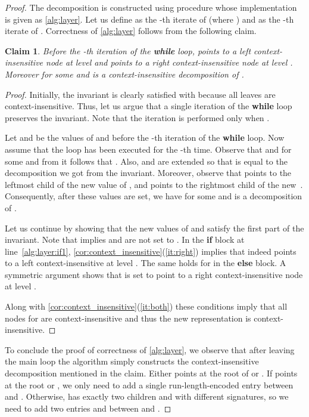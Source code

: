 \documentclass[a4paper]{article}
\newtheorem{claim}[theorem]{Claim}
\theoremstyle{remark}
\begin{document}
\begin{proof}
The decomposition is constructed using procedure  whose implementation is given as \cref{alg:layer}.
Let us define  as the -th iterate of  (where )
and  as the -th iterate of .
Correctness of \cref{alg:layer} follows from the following claim.

\begin{claim}
Before the -th iteration of the \textbf{while} loop,
 points to a left context-insensitive node at level  and  points to a right context-insensitive node at level .
Moreover  for some  and 
is a context-insensitive decomposition of .
\end{claim}
\begin{proof}
Initially, the invariant is clearly satisfied with  because all leaves are context-insensitive.
Thus, let us argue that a single iteration of the \textbf{while} loop preserves the invariant.
Note that the iteration is performed only when .

Let  and  be the values of  and  before the -th iteration
of the \textbf{while} loop.
Now assume that the loop has been executed for the -th time.
Observe that  and  for some 
and from  it follows that .
Also,  and  are extended so that
 is equal to the decomposition
we got from the invariant. Moreover, observe that  points to the leftmost child of the new value of ,
and  points to the rightmost child of the new~. Consequently, after these values are set, we have  for some 
and  is a decomposition of .

Let us continue by showing that the new values of  and  satisfy the first part of the invariant.
Note that  implies  and  are not set to .
In the \textbf{if} block at line~\ref{alg:layer:if1}, \cref{cor:context_insensitive}(\ref{it:right}) implies
that  indeed points to a left context-insensitive at level .
The same holds for  in the \textbf{else} block.
A symmetric argument shows that  is set to point to a right context-insensitive node at level .

Along with \cref{cor:context_insensitive}(\ref{it:both}) these conditions imply
 that all nodes  for  are context-insensitive and thus the new representation is context-insensitive.
\end{proof}

To conclude the proof of correctness of \cref{alg:layer}, we observe that after leaving the main loop
the algorithm simply constructs the context-insensitive decomposition mentioned in the claim.
Either  points at the root of  or .
If  points at the root or , we only need to add a single
run-length-encoded entry between  and .
Otherwise,  has exactly two children  and  with
different signatures, so we need to add two entries
 and  between  and .
\end{proof}
\end{document}

